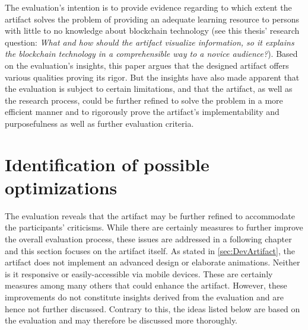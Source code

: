 The evaluation's intention is to provide evidence regarding to which extent the artifact solves the problem of providing an adequate learning resource to persons with little to no knowledge about blockchain technology (see this thesis' research question: \textit{What and how should the artifact visualize information, so it explains the blockchain technology in a comprehensible way to a novice audience?}).
Based on the evaluation's insights, this paper argues that the designed artifact offers various qualities proving its rigor. But the insights have also made apparent that the evaluation is subject to certain limitations, and that the artifact, as well as the research process, could be further refined to solve the problem in a more efficient manner and to rigorously prove the artifact's implementability and purposefulness as well as further evaluation criteria. 

\section{Identification of possible optimizations} \label{sec:Optimizations}
The evaluation reveals that the artifact may be further refined to accommodate the participants' criticisms. While there are certainly measures to further improve the overall evaluation process, these issues are addressed in a following chapter and this section focuses on the artifact itself. As stated in \ref{sec:DevArtifact}, the artifact does not implement an advanced design or elaborate animations. Neither is it responsive or easily-accessible via mobile devices. These are certainly measures among many others that could enhance the artifact. However, these improvements do not constitute insights derived from the evaluation and are hence not further discussed. Contrary to this, the ideas listed below are based on the evaluation and may therefore be discussed more thoroughly.

